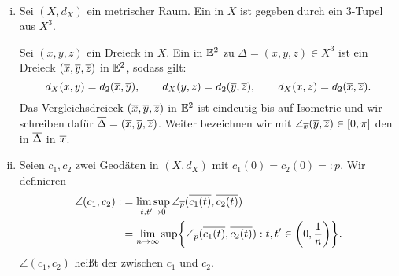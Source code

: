 \begin{definition}
\label{def:2.41}
	\mbox{} \\[-1.35cm]
	\begin{enumerate}[(i)]
		\item Sei $(X,d_X)$ ein metrischer Raum. 
		Ein  in $X$ ist gegeben durch ein $3$-Tupel aus $X^3$.
		
		Sei $(x,y,z)$ ein Dreieck in $X$.
		Ein  in $\mathbb{E}^2$ zu $\Delta = (x,y,z) \in X^3$ ist ein Dreieck $(\overline{x},\overline{y},\overline{z})$ in $\mathbb{E}^2$, sodass gilt:
		\[
			d_X(x,y) = d_2(\overline{x},\overline{y}), \qquad d_X(y,z) = d_2(\overline{y},\overline{z}), \qquad d_X(x,z) = d_2(\overline{x},\overline{z}).
		\]
		Das Vergleichsdreieck $(\overline{x},\overline{y},\overline{z})$ in $\mathbb{E}^2$ ist eindeutig bis auf Isometrie und wir schreiben dafür $\overline{\Delta} = (\overline{x},\overline{y},\overline{z})$.
		Weiter bezeichnen wir mit $\angle_{\overline{x}}(\overline{y},\overline{z}) \in [0,\pi]$ den  in $\overline{\Delta}$ in $\overline{x}$.
		\item Seien $c_1,c_2$ zwei Geodäten in $(X,d_X)$ mit $c_1(0) = c_2(0) =:p$.
		Wir definieren
		\begin{align*}
			\angle(c_1,c_2) :&= \limsup_{t,t' \rightarrow 0} \angle_{\ol{p}} (\ol{c_1(t)},\ol{c_2(t)}) \\
			&= \lim\limits_{n \rightarrow \infty} \sup \penbrace*{ \angle_{\ol{p}}(\ol{c_1(t)},\ol{c_2(t)}) : t,t' \in \enbrace*{0,\frac{1}{n}}}.
		\end{align*}
		$\angle(c_1,c_2)$ heißt der  zwischen $c_1$ und $c_2$.
	\end{enumerate}
\end{definition}

